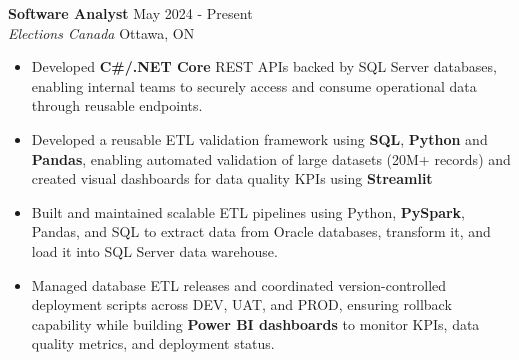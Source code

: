 \documentclass[a4paper]{article}
\begin{document}
\textbf{Software Analyst} \hfill May 2024 - Present\\
\textit{Elections Canada} \hfill Ottawa, ON\\
\vspace{-2mm}
\begin{itemize} \itemsep -2pt
\item Developed \textbf{C\#/.NET Core} REST APIs backed by SQL Server databases, enabling internal teams to securely access and consume operational data through reusable endpoints.

\item Developed a reusable ETL validation framework using \textbf{SQL}, \textbf{Python} and \textbf{Pandas}, enabling automated validation of large datasets (20M+ records) and created visual dashboards for data quality KPIs using \textbf{Streamlit}

\item Built and maintained scalable ETL pipelines using Python, \textbf{PySpark}, Pandas, and SQL to extract data from Oracle databases, transform it, and load it into SQL Server data warehouse.

\item Managed database ETL releases and coordinated version-controlled deployment scripts across DEV, UAT, and PROD, ensuring rollback capability while building \textbf{Power BI dashboards} to monitor KPIs, data quality metrics, and deployment status.

\end{itemize}
\end{document}
